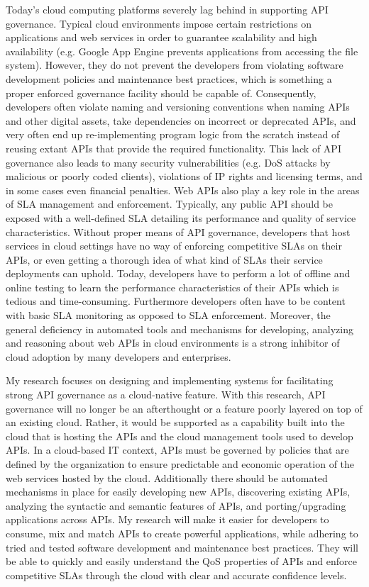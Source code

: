 \documentclass[10pt]{article}
\begin{document}
Today's cloud computing platforms severely lag behind in supporting
API governance. Typical cloud environments impose certain restrictions
on applications and web services in order to guarantee scalability
and high availability (e.g. Google App Engine prevents applications from accessing
the file system). 
However, they do not prevent the developers from violating
software development policies and maintenance best practices,
which is something a proper enforced governance facility should be capable of. 
Consequently, developers often violate naming and versioning conventions
when naming APIs and other digital assets, take dependencies
on incorrect or deprecated APIs, and very often end up re-implementing program logic
from the scratch instead of reusing extant APIs that provide the required functionality.
This lack of API governance also leads to many security vulnerabilities (e.g. DoS attacks
by malicious or poorly coded clients), violations of IP rights and licensing terms, and in
some cases even financial penalties. Web APIs also play a key role in the areas of SLA
management and enforcement. Typically, any public API should be exposed with a well-defined
SLA detailing its performance and quality of service characteristics. Without proper means
of API governance, developers that host services in cloud settings have no way of enforcing
competitive SLAs on their APIs, or even getting a thorough idea of what kind of SLAs
their service deployments can uphold. Today, developers have to perform a lot of offline
and online testing to learn the performance characteristics of their APIs which is tedious and
time-consuming. Furthermore developers often have to be content with basic SLA monitoring 
as opposed to SLA enforcement. Moreover, the general deficiency in automated tools and
mechanisms for developing, analyzing and reasoning about web APIs in cloud environments
is a strong inhibitor of cloud adoption by many developers and enterprises.

My research focuses on designing and implementing systems for facilitating 
strong API governance as a cloud-native feature. With this research, API
governance will no longer be an afterthought or a feature poorly layered on
top of an existing cloud. Rather, it would be supported as a capability built into
the cloud that is hosting the APIs and the cloud management
tools used to develop APIs. 
In a cloud-based IT context, APIs must be governed by
policies that are defined by the organization to ensure predictable and
economic operation of the web services hosted by the cloud. Additionally
there should be automated mechanisms in place for easily developing new
APIs, discovering existing APIs, analyzing the syntactic and semantic features
of APIs, and porting/upgrading applications across APIs. My research will make 
it easier for developers to consume, mix and match APIs to create powerful
applications, while adhering to tried and tested software development and 
maintenance best practices. They will be able to quickly and easily understand
the QoS properties of APIs and enforce competitive SLAs through the cloud
with clear and accurate confidence levels.
\end{document}
